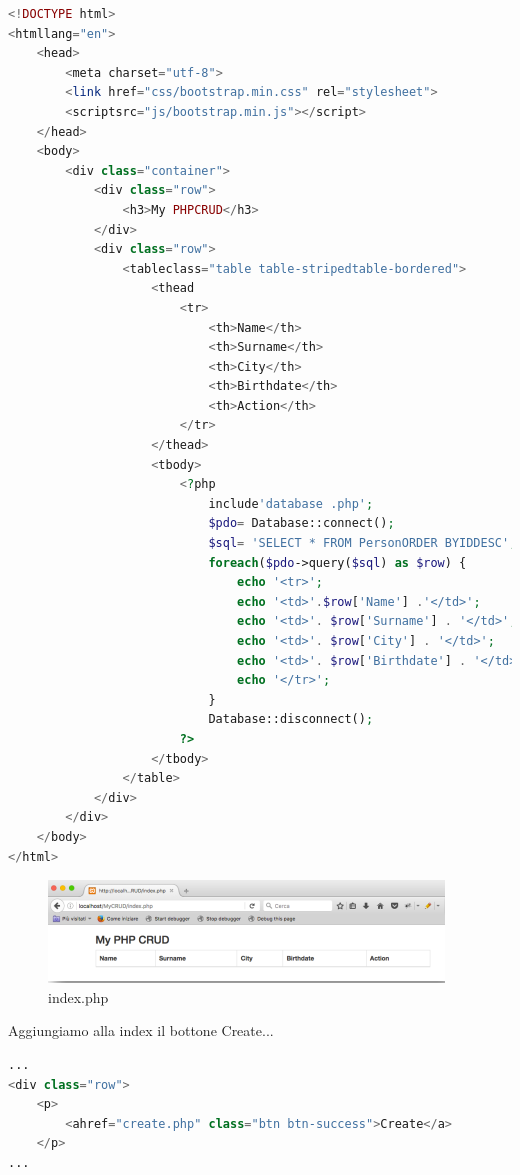 \begin{lstlisting}[language=PHP]
<!DOCTYPE html>
<htmllang="en">
	<head>
        <meta charset="utf-8">
        <link href="css/bootstrap.min.css" rel="stylesheet">
        <scriptsrc="js/bootstrap.min.js"></script>
    </head> 
    <body>
        <div class="container">
            <div class="row">
                <h3>My PHPCRUD</h3>
            </div>
            <div class="row">
                <tableclass="table table-stripedtable-bordered">
                    <thead
                        <tr>
                            <th>Name</th>
                            <th>Surname</th> 
                            <th>City</th>
                            <th>Birthdate</th>
                            <th>Action</th>
                        </tr>
                    </thead> 
                    <tbody>
                        <?php
                            include'database .php';
                            $pdo= Database::connect();
                            $sql= 'SELECT * FROM PersonORDER BYIDDESC';
                            foreach($pdo->query($sql) as $row) {
                                echo '<tr>';
                                echo '<td>'.$row['Name'] .'</td>';
                                echo '<td>'. $row['Surname'] . '</td>';
                                echo '<td>'. $row['City'] . '</td>';
                                echo '<td>'. $row['Birthdate'] . '</td>';
                                echo '</tr>';
                            } 
                            Database::disconnect();
                        ?> 
                    </tbody>
                </table> 
            </div> 
        </div> 
    </body> 
</html> 
\end{lstlisting}

\begin{center}
\begin{figure}[H]
\centering
\includegraphics[scale=1]{figures/indexphp2.png}
\caption{index.php} 
\end{figure}
\end{center}

Aggiungiamo alla index il bottone Create...

\begin{lstlisting}[language=PHP]
...
<div class="row">
    <p>
        <ahref="create.php" class="btn btn-success">Create</a>
    </p> 
...
\end{lstlisting}

